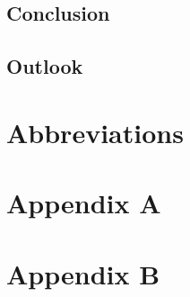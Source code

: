 \section{Conclusion}
\section{Outlook}


\chapter{Abbreviations}


\printbibliography[heading=bibintoc]

\chapter{Appendix A}\label{appendix a}

\chapter{Appendix B}\label{appendix b}
%


